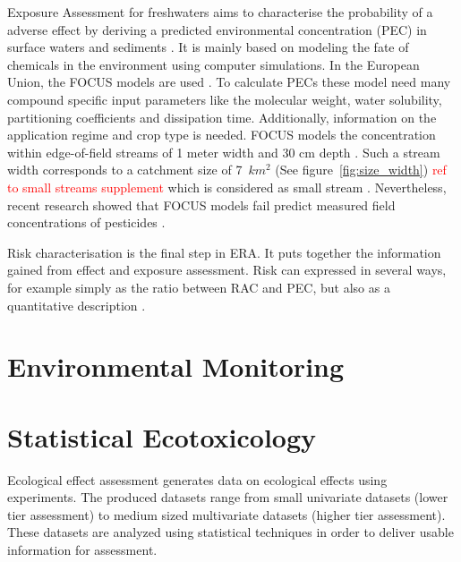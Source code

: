 Exposure Assessment for freshwaters aims to characterise the probability of a adverse effect by deriving a predicted environmental concentration (PEC) in surface waters and sediments \citep{newman_fundamentals_2015}. 
It is mainly based on modeling the fate of chemicals in the environment using computer simulations. 
In the European Union, the FOCUS models are used \citep{focus_focus_2001, efsa_guidance_2013}.
To calculate PECs these model need many compound specific input parameters like the molecular weight, water solubility, partitioning coefficients and dissipation time. 
Additionally, information on the application regime and crop type is needed. 
FOCUS models the concentration within edge-of-field streams of 1 meter width and 30 cm depth \citep{erlacher_regulation_2011}. 
Such a stream width corresponds to a catchment size of 7~$km^2$ (See figure~\ref{fig:size_width}) \textcolor{red}{ref to small streams supplement} which is considered as small stream \citep{lorenz_specifics_2016}. 
Nevertheless, recent research showed that FOCUS models fail predict measured field concentrations of pesticides \citep{knabel_regulatory_2012, knabel_fungicide_2014}. 

Risk characterisation is the final step in ERA.
It puts together the information gained from effect and exposure assessment. 
Risk can expressed in several ways, for example simply as the ratio between RAC and PEC, but also as a quantitative description \citep{efsa_guidance_2013, suter_ecological_2007}.



\section{Environmental Monitoring}




\section{Statistical Ecotoxicology}
Ecological effect assessment generates data on ecological effects using experiments. 
The produced datasets range from small univariate datasets (lower tier assessment) to medium sized multivariate datasets (higher tier assessment).
These datasets are analyzed using statistical techniques in order to deliver usable information for assessment.

